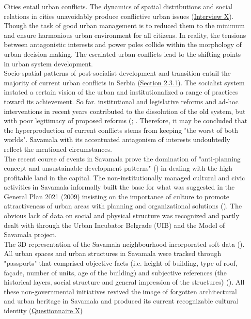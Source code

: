 \documentclass[11pt]{report}
\begin{document}
Cities entail urban conflicts. The dynamics of spatial distributions and social relations in cities unavoidably produce conflictive urban issues (\href{InterviewX}{Interview X}).
Though the task of good urban management is to reduced them to the minimum and ensure harmonious urban environment for all citizens.
In reality, the tensions between antagonistic interests and power poles collide within the morphology of urban decision-making. The escalated urban conflicts lead to the shifting points in urban system development.
\\

Socio-spatial patterns of post-socialist development and transition entail the majority of current urban conflicts in Serbia (\href{Section 2.3.1}{Section 2.3.1}).
The socialist system instated a certain vision of the urban and institutionalized a range of practices toward its achievement.
So far. institutional and legislative reforms and ad-hoc interventions in recent years contributed to the dissolution of the old system, but with poor legitimacy of proposed reforms (\cite{WorldBank2013}; \cite{ VujosevicEtAl.2010}.
Therefore, it may be concluded that the hyperproduction of current conflicts stems from keeping "the worst of both worlds".
Savamala with its accentuated antagonism of interests undoubtedly reflect the mentioned circumstances.
\\

The recent course of events in Savamala prove the domination of "anti-planning concept and unsustainable development patterns" (\cite{ VujosevicEtAl.2010}) in dealing with the high profitable land in the capital.
The non-institutionally managed cultural and civic activities in Savamala informally built the base for what was suggested in the General Plan 2021 (2009) insisting on the importance of culture to promote attractiveness of urban areas with planning and organizational solutions (\cite{GPXXX}).
The obvious lack of data on social and physical structure was recognized and partly dealt with through the Urban Incubator Belgrade (UIB) and the Model of Savamala project.
\\

The 3D representation of the Savamala neighbourhood incorporated soft data (\cite{CvetinovicEtAl2013}).
All urban spaces and urban structures in Savamala were tracked through "passports" that comprised objective facts (i.e. height of building, type of roof, façade, number of units, age of the building) and subjective references (the historical layers, social structure and general impression of the structures) (\cite{Lee2013}).
All these non-governmental initiatives revived the image of forgotten architectural and urban heritage in Savamala and produced its current recognizable cultural identity
(\href{Questionnaire PhD Savamala}{Questionnaire X})
\\
\end{document}
